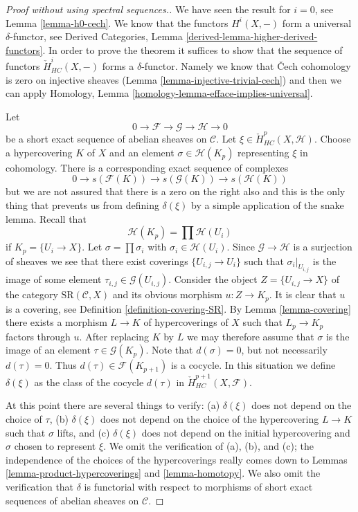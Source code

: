 \documentclass{stacks-project}
\theoremstyle{plain}
\theoremstyle{definition}
\theoremstyle{remark}
\numberwithin{equation}{subsection}
\begin{document}
\begin{proof}[Proof without using spectral sequences.]
We have seen the result for $i = 0$, see Lemma \ref{lemma-h0-cech}.
We know that the functors $H^i(X, -)$ form a universal $\delta$-functor, see
Derived Categories, Lemma \ref{derived-lemma-higher-derived-functors}.
In order to prove the theorem it suffices to show that
the sequence of functors $\check{H}^i_{HC}(X, -)$ forms a
$\delta$-functor. Namely we know that {\v C}ech cohomology
is zero on injective sheaves (Lemma \ref{lemma-injective-trivial-cech})
and then we can apply
Homology, Lemma \ref{homology-lemma-efface-implies-universal}.

\medskip\noindent
Let
$$
0 \to \mathcal{F} \to \mathcal{G} \to \mathcal{H} \to 0
$$
be a short exact sequence of abelian sheaves on $\mathcal{C}$.
Let $\xi \in \check{H}^p_{HC}(X, \mathcal{H})$. Choose a hypercovering
$K$ of $X$ and an element $\sigma \in \mathcal{H}(K_p)$ representing
$\xi$ in cohomology. There is a corresponding exact sequence of
complexes
$$
0 \to s(\mathcal{F}(K)) \to s(\mathcal{G}(K)) \to s(\mathcal{H}(K))
$$
but we are not assured that there is a zero on the right also and this
is the only thing that
prevents us from defining $\delta(\xi)$ by a simple application of the
snake lemma. Recall that
$$
\mathcal{H}(K_p) = \prod \mathcal{H}(U_i)
$$
if $K_p = \{U_i \to X\}$. Let $\sigma =\prod \sigma_i$ with
$\sigma_i \in \mathcal{H}(U_i)$. Since $\mathcal{G} \to \mathcal{H}$ is
a surjection of sheaves we see that there exist coverings
$\{U_{i, j} \to U_i\}$ such that $\sigma_i|_{U_{i, j}}$ is the
image of some element $\tau_{i, j} \in \mathcal{G}(U_{i, j})$.
Consider the object $Z = \{U_{i, j} \to X\}$ of the category
$\text{SR}(\mathcal{C}, X)$ and its obvious morphism
$u : Z \to K_p$. It is clear that $u$ is a covering, see
Definition \ref{definition-covering-SR}. By
Lemma \ref{lemma-covering} there
exists a morphism $L \to K$ of hypercoverings of $X$ such that
$L_p \to K_p$ factors through $u$. After replacing $K$ by $L$
we may therefore assume that $\sigma$ is the image of an
element $\tau \in \mathcal{G}(K_p)$. Note that $d(\sigma) = 0$,
but not necessarily $d(\tau) = 0$. Thus $d(\tau) \in \mathcal{F}(K_{p + 1})$
is a cocycle. In this situation we define
$\delta(\xi)$ as the class of the cocycle $d(\tau)$ in
$\check{H}^{p + 1}_{HC}(X, \mathcal{F})$.

\medskip\noindent
At this point there are several things to verify:
(a) $\delta(\xi)$ does not depend on the choice of $\tau$,
(b) $\delta(\xi)$ does not depend on the choice of the hypercovering
$L \to K$ such that $\sigma$ lifts, and
(c) $\delta(\xi)$ does not depend on the initial hypercovering and
$\sigma$ chosen to represent $\xi$. We omit the verification of
(a), (b), and (c); the independence of the choices of the hypercoverings
really comes down to Lemmas \ref{lemma-product-hypercoverings}
and \ref{lemma-homotopy}. We also omit the verification that
$\delta$ is functorial with respect to morphisms of short exact
sequences of abelian sheaves on $\mathcal{C}$.


\end{proof}
\end{document}
